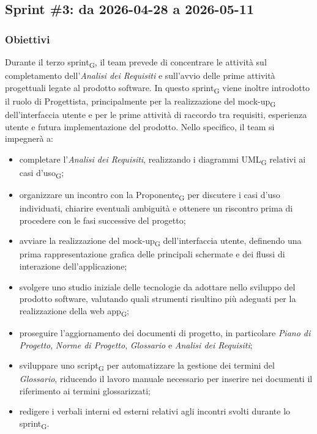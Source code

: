 ﻿\documentclass[a4paper, 10pt, colorlinks=true, linkcolor=black, urlcolor=blue, citecolor=blue, hidelinks]{article}
\begin{document}
\subsection{Sprint \#3: da 2026-04-28 a 2026-05-11}
\subsubsection{Obiettivi}
Durante il terzo sprint\textsubscript{G}, il team prevede di concentrare le attività sul completamento dell'\textit{Analisi dei Requisiti} e sull'avvio delle prime attività progettuali legate al prodotto software. 
In questo sprint\textsubscript{G} viene inoltre introdotto il ruolo di Progettista, principalmente per la realizzazione del mock-up\textsubscript{G} dell'interfaccia utente e per le prime attività di raccordo tra requisiti, esperienza utente e futura implementazione del prodotto.
Nello specifico, il team si impegnerà a:
\begin{itemize}
    \item completare l'\textit{Analisi dei Requisiti}, realizzando i diagrammi UML\textsubscript{G} relativi ai casi d'uso\textsubscript{G};

    \item organizzare un incontro con la Proponente\textsubscript{G} per discutere i casi d'uso individuati, chiarire eventuali ambiguità e ottenere un riscontro prima di procedere con le fasi successive del progetto;

    \item avviare la realizzazione del mock-up\textsubscript{G} dell'interfaccia utente, definendo una prima rappresentazione grafica delle principali schermate e dei flussi di interazione dell'applicazione;

    \item svolgere uno studio iniziale delle tecnologie da adottare nello sviluppo del prodotto software, valutando quali strumenti risultino più adeguati per la realizzazione della web app\textsubscript{G};

    \item proseguire l'aggiornamento dei documenti di progetto, in particolare \textit{Piano di Progetto}, \textit{Norme di Progetto}, \textit{Glossario} e \textit{Analisi dei Requisiti};

    \item sviluppare uno script\textsubscript{G} per automatizzare la gestione dei termini del \textit{Glossario}, riducendo il lavoro manuale necessario per inserire nei documenti il riferimento ai termini glossarizzati;
    \item redigere i verbali interni ed esterni relativi agli incontri svolti durante lo sprint\textsubscript{G}.
\end{itemize}
\end{document}
